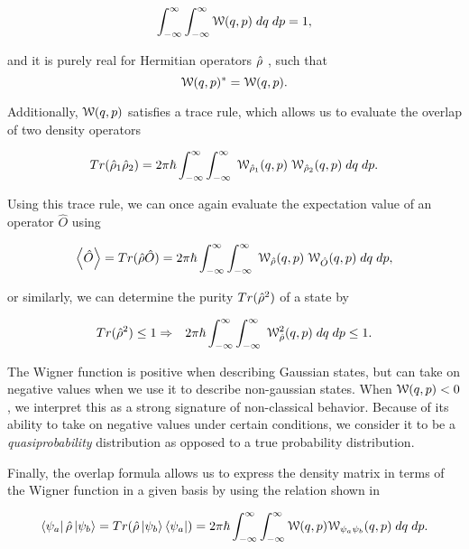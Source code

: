 \begin{equation}
  \label{eq:normalized_wigner}
  \int^\infty_{-\infty} \int^\infty_{-\infty} \mathcal{W}(q,p) \; dq \; dp = 1,
\end{equation}

\noindent
and it is purely real for Hermitian operators $\hat{\rho}$ , such that
 \begin{equation}
   \label{eq:wigner_is_real}
   \mathcal{W}(q,p)^* = \mathcal{W}(q,p).
 \end{equation}

\noindent
Additionally, $\mathcal{W}(q,p)$ satisfies a trace rule, which allows us to evaluate the overlap of two density operators 

\begin{equation}
  \label{eq:wigner_overlap}
  Tr(\hat{\rho}_1 \hat{\rho}_2) = 2 \pi \hbar \int^\infty_{-\infty} \int^\infty_{-\infty} \;
\mathcal{W}_{\hat{\rho}_1}(q,p) \; \mathcal{W}_{\hat{\rho}_2}(q,p) \; dq \; dp.
\end{equation}

\noindent
Using this trace rule, we can once again evaluate the expectation value of an operator $\hat{O}$ using

\begin{equation}
  \label{eq:wigner_expectation}
  \left< \hat{O} \right> =  Tr(\hat{\rho} \hat{O}) = 2 \pi \hbar \int^\infty_{-\infty} \int^\infty_{-\infty} \;
\mathcal{W}_{\hat{\rho}}(q,p) \; \mathcal{W}_{\hat{O}}(q,p) \; dq \; dp,
\end{equation}

\noindent
or similarly, we can determine the purity $Tr(\hat{\rho}^2)$ of a state by


\begin{eqnarray}
  \label{eq:wigner_purity}
  Tr(\hat{\rho}^2) \le 1    & \Rightarrow & 2 \pi \hbar \int^\infty_{-\infty} \int^\infty_{-\infty} \;
\mathcal{W}^2_{\hat{\rho}}(q,p) \; dq \; dp \le 1.
\end{eqnarray}

\noindent
The Wigner function is positive when describing Gaussian states, but can take on negative values when we use it to describe non-gaussian states.  When $\mathcal{W}(q,p) < 0$, we interpret this as a strong signature of non-classical behavior.  Because of its ability to take on negative values under certain conditions, we consider it to be a \emph{quasiprobability} distribution as opposed to a true probability distribution.

Finally, the overlap formula allows us to express the density matrix in terms of the Wigner function in a given basis by using the relation shown in \cite{leonhardt1997measuring}

\begin{equation}
  \label{eq:wigner_to_density}
  \left< \psi_a \right| \hat{\rho} \left| \psi_b \right> = Tr(\hat{\rho} \left| \psi_b \right>\left< \psi_a \right|) = 2
\pi \hbar \int^\infty_{-\infty} \int^\infty_{-\infty} \mathcal{W}(q,p) \mathcal{W}_{\psi_a \psi_b}(q,p) \; dq \;
dp.
\end{equation}

